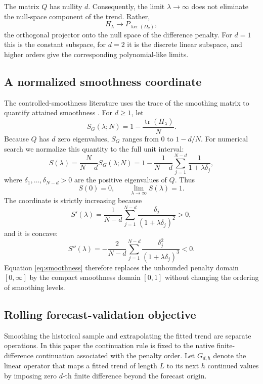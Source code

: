 \documentclass[english]{smcca}
\newcommand{\tr}{\operatorname{tr}}
\begin{document}
The matrix \(Q\) has nullity \(d\). Consequently, the limit \(\lambda\to\infty\) does not eliminate the null-space component of the trend. Rather,
\[
H_\lambda
\longrightarrow
P_{\ker(D_d)},
\]
the orthogonal projector onto the null space of the difference penalty. For \(d=1\) this is the constant subspace, for \(d=2\) it is the discrete linear subspace, and higher orders give the corresponding polynomial-like limits.

\subsection{A normalized smoothness coordinate}

The controlled-smoothness literature uses the trace of the smoothing matrix to quantify attained smoothness \cite{guerrero2008smoothness,cortes2017smoothness}. For \(d\ge1\), let
\[
S_G(\lambda;N)
=
1-\frac{\tr(H_\lambda)}{N}.
\]
Because \(Q\) has \(d\) zero eigenvalues, \(S_G\) ranges from \(0\) to \(1-d/N\). For numerical search we normalize this quantity to the full unit interval:
\begin{equation}
S(\lambda)
=
\frac{N}{N-d}S_G(\lambda;N)
=
1-
\frac{1}{N-d}
\sum_{j=1}^{N-d}
\frac{1}{1+\lambda\delta_j},
\label{eq:smoothness}
\end{equation}
where \(\delta_1,\ldots,\delta_{N-d}>0\) are the positive eigenvalues of \(Q\). Thus
\[
S(0)=0,
\qquad
\lim_{\lambda\to\infty}S(\lambda)=1.
\]
The coordinate is strictly increasing because
\begin{equation}
S'(\lambda)
=
\frac{1}{N-d}
\sum_{j=1}^{N-d}
\frac{\delta_j}{(1+\lambda\delta_j)^2}
>0,
\label{eq:sprime}
\end{equation}
and it is concave:
\begin{equation}
S''(\lambda)
=
-\frac{2}{N-d}
\sum_{j=1}^{N-d}
\frac{\delta_j^2}{(1+\lambda\delta_j)^3}
<0.
\label{eq:ssecond}
\end{equation}
Equation \eqref{eq:smoothness} therefore replaces the unbounded penalty domain \([0,\infty]\) by the compact smoothness domain \([0,1]\) without changing the ordering of smoothing levels.

\subsection{Rolling forecast-validation objective}

Smoothing the historical sample and extrapolating the fitted trend are separate operations. In this paper the continuation rule is fixed to the native finite-difference continuation associated with the penalty order. Let \(G_{d,h}\) denote the linear operator that maps a fitted trend of length \(L\) to its next \(h\) continued values by imposing zero \(d\)-th finite difference beyond the forecast origin.
\end{document}
